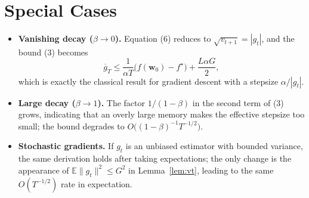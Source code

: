 \documentclass{article}
\begin{document}
\section*{Special Cases}
\begin{itemize}
\item \textbf{Vanishing decay ($\beta\to0$).}  Equation (6) reduces to $\sqrt{v_{t+1}}=|g_{t}|$, and the bound (3) becomes
\[
\overline{g}_{T}\le \frac{1}{\alpha T}\bigl(f(\mathbf w_{0})-f^{\star}\bigr)
+\frac{L\alpha G}{2},
\]
which is exactly the classical result for gradient descent with a stepsize $\alpha/|g_{t}|$.
\item \textbf{Large decay ($\beta\to1$).}  The factor $1/(1-\beta)$ in the second term of (3) grows,
indicating that an overly large memory makes the effective stepsize too small; the bound
degrades to $O\!\bigl((1-\beta)^{-1}T^{-1/2}\bigr)$.
\item \textbf{Stochastic gradients.}  If $g_{t}$ is an unbiased estimator with bounded variance,
the same derivation holds after taking expectations; the only change is the appearance of
$\mathbb{E}\|g_{t}\|^{2}\le G^{2}$ in Lemma~\ref{lem:vt}, leading to the same $O(T^{-1/2})$ rate
in expectation.
\end{itemize}
\end{document}
